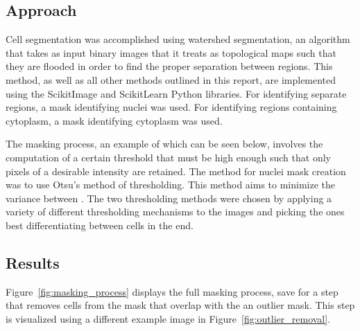 \documentclass[11pt]{article}
\begin{document}
\subsection{Approach}

Cell segmentation was accomplished using watershed segmentation, an algorithm that takes as input
binary images that it treats as topological maps such that they are flooded in order to find the
proper separation between regions. This method, as well as all other methods outlined in this
report, are implemented using the ScikitImage and ScikitLearn Python libraries. For identifying
separate regions, a mask identifying nuclei was used. For identifying regions containing cytoplasm,
a mask identifying cytoplasm was used. 

The masking process, an example of which can be seen below, involves the computation of a certain
threshold that must be high enough such that only pixels of a desirable intensity are retained. The
method for nuclei mask creation was to use Otsu's method of thresholding. This method aims to
minimize the variance between . The two thresholding methods were chosen by applying a variety of
different thresholding mechanisms to the images and picking the ones best differentiating between
cells in the end. 

\subsection{Results}

Figure~\ref{fig:masking_process} displays the full masking process, save for a step that removes
cells from the mask that overlap with the an outlier mask. This step is visualized using a different
example image in Figure~\ref{fig:outlier_removal}.
\end{document}
